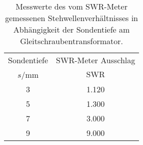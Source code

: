 \begin{table}[!h]
	\centering
	\begin{tabular}{cc}
		\toprule
		Sondentiefe & SWR-Meter Ausschlag\\
		$s$/\si{mm} & $\mathrm{SWR}$\\
\midrule
		\num{3} & \num{1.120}\\
		\num{5} & \num{1.300}\\
		\num{7} & \num{3.000}\\
		\num{9} & \num{9.000}\\
		\bottomrule
	\end{tabular}
	\caption{Messwerte des vom SWR-Meter gemessenen Stehwellenverhältnisses in Abhängigkeit der Sondentiefe 
                am Gleitschraubentransformator. \label{tab:SWR_Meter}}
\end{table}

